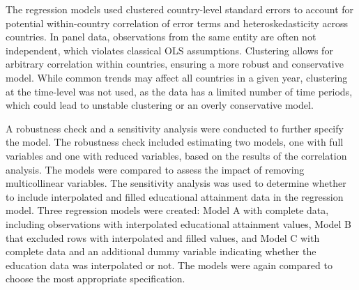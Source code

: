 The regression models used clustered country-level standard errors to account for potential within-country correlation of error terms and heteroskedasticity across countries. 
In panel data, observations from the same entity are often not independent, which violates classical OLS assumptions. 
Clustering allows for arbitrary correlation within countries, ensuring a more robust and conservative model. 
While common trends may affect all countries in a given year, clustering at the time-level was not used, as the data has a limited number of time periods, which could lead to unstable clustering 
or an overly conservative model.

A robustness check and a sensitivity analysis were conducted to further specify the model.
The robustness check included estimating two models, one with full variables and one with reduced variables, based on the results of the correlation analysis. 
The models were compared to assess the impact of removing multicollinear variables.
The sensitivity analysis was used to determine whether to include interpolated and filled educational attainment data in the regression model. 
Three regression models were created: Model A with complete data, including observations with interpolated educational attainment values, Model B that excluded rows with interpolated and filled values, and Model C with complete data and an additional dummy variable indicating whether the education data was interpolated or not. 
The models were again compared to choose the most appropriate specification.